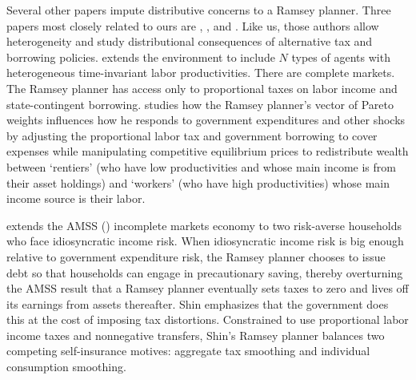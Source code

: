 \documentclass[thmsb,11pt]{article}
\begin{document}
Several other papers impute distributive concerns to a Ramsey planner.
Three papers  most closely related to ours are \citet{Bassetto1999}, \citet{shin2006ramsey}, and \citet{Wer07a}. Like us, those authors allow heterogeneity and study
distributional consequences of alternative tax and borrowing policies.
\citet{Bassetto1999} extends the \citet{LucasJr.1983} environment to include $N$ types of
agents with heterogeneous  time-invariant labor productivities. There are complete markets.  The Ramsey planner  has access only
to proportional taxes on labor income and state-contingent borrowing. \citeauthor{Bassetto1999}  studies how the Ramsey planner's vector of Pareto weights
influences how he responds to government expenditures and other shocks by
adjusting the proportional labor tax and government borrowing to cover
expenses while manipulating competitive equilibrium prices to redistribute wealth between
 `rentiers' (who have low productivities and  whose main income is from their asset holdings)
and  `workers' (who have high productivities) whose main income source is their labor.

\citet{shin2006ramsey} extends the AMSS  (\citet{Aiyagari2002}) incomplete markets economy to  two risk-averse households who
face idiosyncratic income risk. When idiosyncratic income risk is big enough
relative to government expenditure risk, the Ramsey planner
chooses to issue debt so that  households can  engage in precautionary
saving, thereby overturning the AMSS result that  a
 Ramsey planner  eventually sets taxes to zero and lives off its earnings from assets thereafter.
  Shin emphasizes that the
government does this at the cost of imposing tax distortions.
Constrained to use proportional labor income taxes and nonnegative
transfers, Shin's Ramsey planner balances two competing self-insurance
motives: aggregate tax smoothing and individual consumption smoothing.
\end{document}
